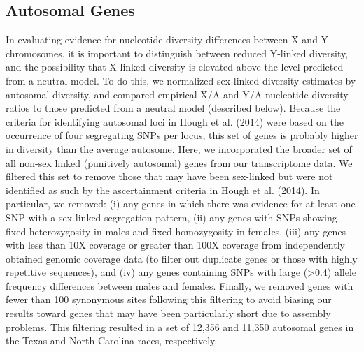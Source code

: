 \documentclass[9pt,twocolumn,twoside]{gsajnl}
\begin{document}
\subsection*{Autosomal Genes}
In evaluating evidence for nucleotide diversity differences between X and Y chromosomes, it is important to distinguish between reduced Y-linked diversity, and the possibility that X-linked diversity is elevated above the level predicted from a neutral model. To do this, we normalized sex-linked diversity estimates by autosomal diversity, and compared empirical X/A and Y/A nucleotide diversity ratios to those predicted from a neutral model (described below). Because the criteria for identifying autosomal loci in Hough et al. (2014) were based on the occurrence of four segregating SNPs per locus, this set of genes is probably higher in diversity than the average autosome. Here, we incorporated the broader set of all non-sex linked (punitively autosomal) genes from our transcriptome data. We filtered this set to remove those that may have been sex-linked but were not identified as such by the ascertainment criteria in Hough et al. (2014). In particular, we removed: (i) any genes in which there was evidence for at least one SNP with a sex-linked segregation pattern, (ii) any genes with SNPs showing fixed heterozygosity in males and fixed homozygosity in females, (iii) any genes with less than 10X coverage or greater than 100X coverage from independently obtained genomic coverage data (to filter out duplicate genes or those with highly repetitive sequences), and (iv) any genes containing SNPs with large (>0.4) allele frequency differences between males and females. Finally, we removed genes with fewer than 100 synonymous sites following this filtering to avoid biasing our results toward genes that may have been particularly short due to assembly problems. This filtering resulted in a set of 12,356 and 11,350 autosomal genes in the Texas and North Carolina races, respectively.
\end{document}
